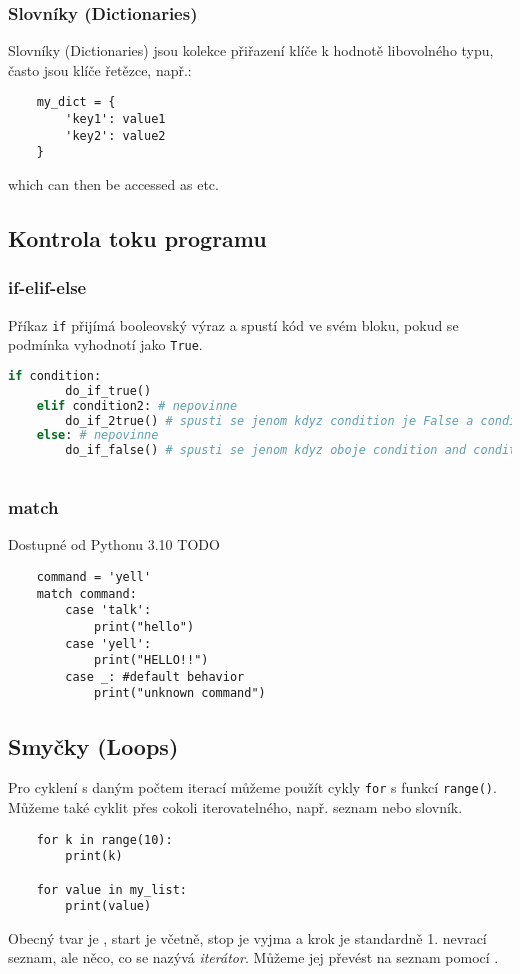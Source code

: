 \subsubsection{Slovníky (Dictionaries)}
Slovníky (Dictionaries) jsou kolekce přiřazení klíče k hodnotě libovolného typu, často jsou klíče řetězce, např.:
\begin{lstlisting}
    my_dict = {
        'key1': value1
        'key2': value2
    }
\end{lstlisting}
which can then be accessed as  etc.

\subsection{Kontrola toku programu}

\subsubsection{if-elif-else}
Příkaz \verb|if| přijímá booleovský výraz a spustí kód ve svém bloku, pokud se podmínka vyhodnotí jako \verb|True|.
\begin{lstlisting}[language=Python]
    if condition:
        do_if_true()
    elif condition2: # nepovinne
        do_if_2true() # spusti se jenom kdyz condition je False a condition2 je True
    else: # nepovinne
        do_if_false() # spusti se jenom kdyz oboje condition and condition2 jsou False
        
\end{lstlisting}

\subsubsection{match}
Dostupné od Pythonu 3.10
TODO
\begin{lstlisting}
    command = 'yell'
    match command:
        case 'talk':
            print("hello")
        case 'yell':
            print("HELLO!!")
        case _: #default behavior
            print("unknown command")
\end{lstlisting}

\subsection{Smyčky (Loops)}
Pro cyklení s daným počtem iterací můžeme použít cykly \verb|for| s funkcí \verb|range()|. Můžeme také cyklit přes cokoli iterovatelného, např. seznam nebo slovník.
\begin{lstlisting}
    for k in range(10):
        print(k)

    for value in my_list:
        print(value) 
\end{lstlisting}
Obecný tvar  je , start je včetně, stop je vyjma a krok je standardně 1.  nevrací seznam, ale něco, co se nazývá \emph{iterátor}. Můžeme jej převést na seznam pomocí .

